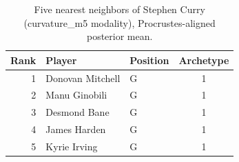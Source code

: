 \begin{table}[htbp]
  \centering\small
  \begin{tabular}{rllc}
    \toprule
    Rank & Player & Position & Archetype \\
    \midrule
    1 & Donovan Mitchell & G & 1 \\
    2 & Manu Ginobili & G & 1 \\
    3 & Desmond Bane & G & 1 \\
    4 & James Harden & G & 1 \\
    5 & Kyrie Irving & G & 1 \\
    \bottomrule
  \end{tabular}
  \caption{Five nearest neighbors of Stephen Curry (curvature_m5 modality), Procrustes-aligned posterior mean.}
  \label{tab:Stephen_Curry_neighbors_curvature_m5}
\end{table}

